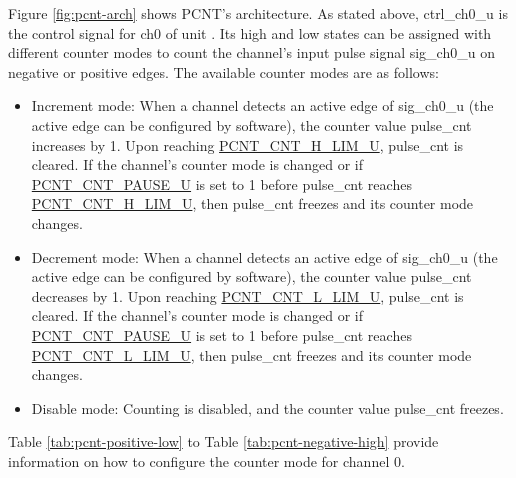 \documentclass[main\_\_EN.tex]{subfiles}
\begin{document}
Figure \ref{fig:pcnt-arch} shows PCNT's architecture. As stated above, ctrl\_ch0\_u is the control signal for ch0 of unit . Its high and low states can be assigned with different counter modes to count the channel's input pulse signal sig\_ch0\_u on negative or positive edges. The available counter modes are as follows:

\begin{itemize}
\item Increment mode: When a channel detects an active edge of sig\_ch0\_u (the active edge can be configured by software), the counter value pulse\_cnt increases by 1. Upon reaching \hyperref[fielddesc:PCNTCNTHLIMUN]{PCNT\_CNT\_H\_LIM\_U}, pulse\_cnt is cleared. If the channel's counter mode is changed or if \hyperref[fielddesc:PCNTCNTPAUSEUN]{PCNT\_CNT\_PAUSE\_U} is set to 1 before pulse\_cnt reaches \hyperref[fielddesc:PCNTCNTHLIMUN]{PCNT\_CNT\_H\_LIM\_U}, then pulse\_cnt freezes and its counter mode changes.

\item Decrement mode: When a channel detects an active edge of sig\_ch0\_u (the active edge can be configured by software), the counter value pulse\_cnt decreases by 1. Upon reaching \hyperref[fielddesc:PCNTCNTLLIMUN]{PCNT\_CNT\_L\_LIM\_U}, pulse\_cnt is cleared. If the channel's counter mode is changed or if \hyperref[fielddesc:PCNTCNTPAUSEUN]{PCNT\_CNT\_PAUSE\_U} is set to 1 before pulse\_cnt reaches \hyperref[fielddesc:PCNTCNTHLIMUN]{PCNT\_CNT\_L\_LIM\_U}, then pulse\_cnt freezes and its counter mode changes.

\item Disable mode: Counting is disabled, and the counter value pulse\_cnt freezes.
\end{itemize}


Table \ref{tab:pcnt-positive-low} to Table  \ref{tab:pcnt-negative-high} provide information on how to configure the counter mode for channel 0.
\end{document}
